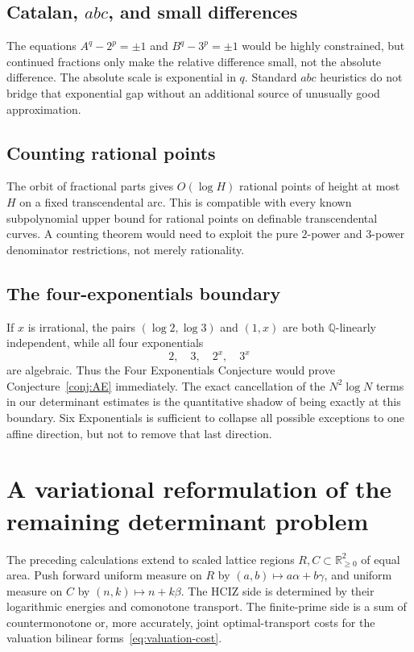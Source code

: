 \documentclass[11pt]{article}
\theoremstyle{definition}
\newcommand{\Q}{\mathbb Q}
\newcommand{\R}{\mathbb R}
\begin{document}
\subsection{Catalan, $abc$, and small differences}

The equations $A^q-2^p=\pm1$ and $B^q-3^p=\pm1$ would be highly constrained,
but continued fractions only make the relative difference small, not the
absolute difference.  The absolute scale is exponential in $q$.  Standard
$abc$ heuristics do not bridge that exponential gap without an additional
source of unusually good approximation.

\subsection{Counting rational points}

The orbit of fractional parts gives $O(\log H)$ rational points of height at
most $H$ on a fixed transcendental arc.  This is compatible with every known
subpolynomial upper bound for rational points on definable transcendental
curves.  A counting theorem would need to exploit the pure $2$-power and
$3$-power denominator restrictions, not merely rationality.

\subsection{The four-exponentials boundary}

If $x$ is irrational, the pairs $(\log2,\log3)$ and $(1,x)$ are both
$\Q$-linearly independent, while all four exponentials
\[
 2,\quad3,\quad2^x,\quad3^x
\]
are algebraic.  Thus the Four Exponentials Conjecture would prove
Conjecture~\ref{conj:AE} immediately.  The exact cancellation of the
$N^2\log N$ terms in our determinant estimates is the quantitative shadow of
being exactly at this boundary.  Six Exponentials is sufficient to collapse
all possible exceptions to one affine direction, but not to remove that last
direction.

\section{A variational reformulation of the remaining determinant problem}

The preceding calculations extend to scaled lattice regions
$R,C\subset\R_{\ge0}^2$ of equal area.  Push forward uniform measure on $R$ by
$(a,b)\mapsto a\alpha+b\gamma$, and uniform measure on $C$ by
$(n,k)\mapsto n+k\beta$.  The HCIZ side is determined by their logarithmic
energies and comonotone transport.  The finite-prime side is a sum of
countermonotone or, more accurately, joint optimal-transport costs for the
valuation bilinear forms~\eqref{eq:valuation-cost}.
\end{document}
